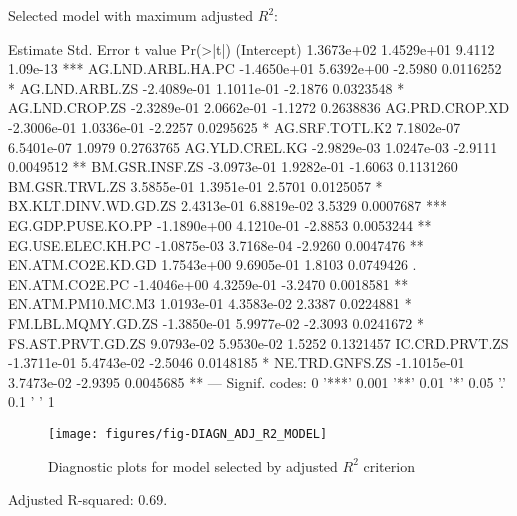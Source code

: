\documentclass[a4paper]{article}
\begin{document}
Selected model with maximum adjusted $R^2$:
\begin{Schunk}
\begin{Soutput}
                        Estimate  Std. Error t value  Pr(>|t|)    
(Intercept)           1.3673e+02  1.4529e+01  9.4112  1.09e-13 ***
AG.LND.ARBL.HA.PC    -1.4650e+01  5.6392e+00 -2.5980 0.0116252 *  
AG.LND.ARBL.ZS       -2.4089e-01  1.1011e-01 -2.1876 0.0323548 *  
AG.LND.CROP.ZS       -2.3289e-01  2.0662e-01 -1.1272 0.2638836    
AG.PRD.CROP.XD       -2.3006e-01  1.0336e-01 -2.2257 0.0295625 *  
AG.SRF.TOTL.K2        7.1802e-07  6.5401e-07  1.0979 0.2763765    
AG.YLD.CREL.KG       -2.9829e-03  1.0247e-03 -2.9111 0.0049512 ** 
BM.GSR.INSF.ZS       -3.0973e-01  1.9282e-01 -1.6063 0.1131260    
BM.GSR.TRVL.ZS        3.5855e-01  1.3951e-01  2.5701 0.0125057 *  
BX.KLT.DINV.WD.GD.ZS  2.4313e-01  6.8819e-02  3.5329 0.0007687 ***
EG.GDP.PUSE.KO.PP    -1.1890e+00  4.1210e-01 -2.8853 0.0053244 ** 
EG.USE.ELEC.KH.PC    -1.0875e-03  3.7168e-04 -2.9260 0.0047476 ** 
EN.ATM.CO2E.KD.GD     1.7543e+00  9.6905e-01  1.8103 0.0749426 .  
EN.ATM.CO2E.PC       -1.4046e+00  4.3259e-01 -3.2470 0.0018581 ** 
EN.ATM.PM10.MC.M3     1.0193e-01  4.3583e-02  2.3387 0.0224881 *  
FM.LBL.MQMY.GD.ZS    -1.3850e-01  5.9977e-02 -2.3093 0.0241672 *  
FS.AST.PRVT.GD.ZS     9.0793e-02  5.9530e-02  1.5252 0.1321457    
IC.CRD.PRVT.ZS       -1.3711e-01  5.4743e-02 -2.5046 0.0148185 *  
NE.TRD.GNFS.ZS       -1.1015e-01  3.7473e-02 -2.9395 0.0045685 ** 
---
Signif. codes:  0 '***' 0.001 '**' 0.01 '*' 0.05 '.' 0.1 ' ' 1
\end{Soutput}
\end{Schunk}

\begin{figure}[H]
\begin{center}
\texttt{[image: figures/fig-DIAGN\_ADJ\_R2\_MODEL]}
\caption{Diagnostic plots for model selected by adjusted $R^2$ criterion}
\end{center}
\end{figure}
Adjusted R-squared:
0.69.
\end{document}
